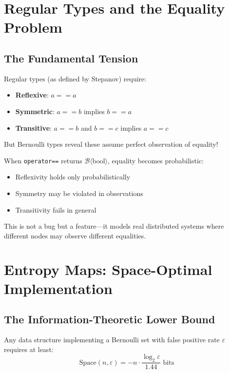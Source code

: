 \section{Regular Types and the Equality Problem}

\subsection{The Fundamental Tension}

Regular types (as defined by Stepanov) require:
\begin{itemize}
\item \textbf{Reflexive}: $a == a$
\item \textbf{Symmetric}: $a == b$ implies $b == a$
\item \textbf{Transitive}: $a == b$ and $b == c$ implies $a == c$
\end{itemize}

But Bernoulli types reveal these assume perfect observation of equality!

\begin{theorem}
When \texttt{operator==} returns $\mathcal{B}\langle\text{bool}\rangle$, equality becomes probabilistic:
\begin{itemize}
\item Reflexivity holds only probabilistically
\item Symmetry may be violated in observations
\item Transitivity fails in general
\end{itemize}
\end{theorem}

This is not a bug but a feature—it models real distributed systems where different nodes may observe different equalities.

\section{Entropy Maps: Space-Optimal Implementation}

\subsection{The Information-Theoretic Lower Bound}

\begin{theorem}
Any data structure implementing a Bernoulli set with false positive rate $\varepsilon$ requires at least:
\begin{equation}
\text{Space}(n, \varepsilon) = -n \cdot \frac{\log_2 \varepsilon}{1.44} \text{ bits}
\end{equation}
\end{theorem}

